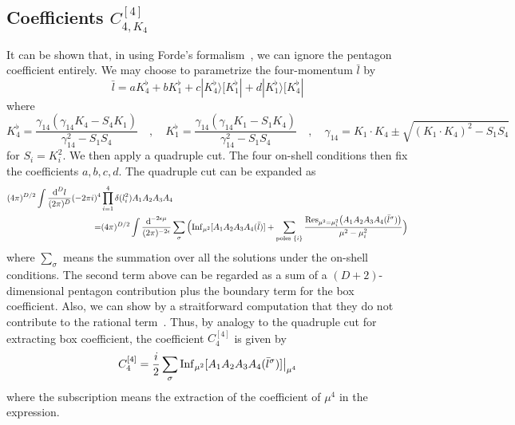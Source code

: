 \subsection*{Coefficients $C_{4, K_4}^{[4]}$}
It can be shown that, in using Forde's formalism~\cite{Forde:2007mi}, we can ignore the pentagon coefficient entirely.
We may choose to parametrize the four-momentum $\bar{l}$ by
\begin{equation}
\bar{l} = a K_4^\flat + bK_1^\flat + c|K_4^\flat\rangle [K_1^\flat| + d|K_1^\flat\rangle[K_4^\flat|
\end{equation}
where
\begin{equation}\label{param_rat_box}
K_4^\flat = \frac{\gamma_{14}(\gamma_{14}K_4 - S_4K_1)}{\gamma_{14}^2 - S_1S_4}
\quad,\quad
K_1^\flat = \frac{\gamma_{14}(\gamma_{14}K_1 - S_1K_4)}{\gamma_{14}^2 - S_1S_4}
\quad,\quad
\gamma_{14} = K_1\cdot K_4\pm\sqrt{(K_1\cdot K_4)^2 - S_1 S_4}
\end{equation}
for $S_i = K_i^2$.
We then apply a quadruple cut.
The four on-shell conditions then fix the coefficients $a,b,c,d$.
The quadruple cut can be expanded as
\begin{equation}
\begin{split}
(4\pi)^{D/2}\int\frac{\textrm{d}^D l}{(2\pi)^D}(-2\pi i)^4 & \prod^4_{i=1}\delta(l_i^2)A_1A_2A_3A_4
\\
= & (4\pi)^{D/2}\int\frac{\textrm{d}^{-2\epsilon \mu}}{(2\pi)^{-2\epsilon}}
\sum_{\sigma}\Big(\mathrm{Inf}_{\mu^2}[A_1 A_2 A_3 A_4(\bar{l})] 
+ \sum_{\textrm{poles $\{i\}$}}\frac{\mathrm{Res}_{\mu^2 = \mu_i^2}\big(A_1A_2A_3A_4(\bar{l}^\sigma)\big)}{\mu^2 - \mu_i^2}\Big)
\end{split}
\end{equation}
where $\sum_\sigma$ means the summation over all the solutions under the on-shell conditions. 
The second term above can be regarded as a sum of a $(D + 2)$-dimensional pentagon contribution plus the boundary term for the box coefficient.
Also, we can show by a straitforward computation that they do not contribute to the rational term~\cite{Badger:2008cm}. 
Thus, by analogy to the quadruple cut for extracting box coefficient, the coefficient $C_4^{[4]}$ is given by
\begin{equation}
C_4^{[4]} = \frac{i}{2}\sum_{\sigma}\mathrm{Inf}_{\mu^2}[A_1A_2A_3A_4(\bar{l}^\sigma)]\big|_{\mu^4}
\end{equation}
where the subscription means the extraction of the coefficient of $\mu^4$ in the expression.
%
%
